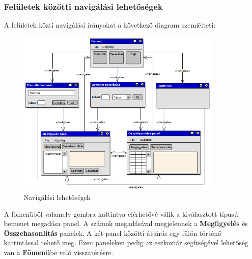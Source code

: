 \documentclass{elteikthesis}
\begin{document}
\subsubsection{Felületek közötti navigálási lehetőségek}
A felületek közti navigálási irányokat a következő diagram szemlélteti:
\begin{figure}[H]
	\centering
	\includegraphics[width=0.9\textwidth]{pics/plan_directions.png}
	\caption{Navigálási lehetőségek}
\end{figure}\par
A főmenüből valamely gombra kattintva elérhetővé válik a kiválasztott típusú bemenet megadása panel. A számok megadásával megjelennek a \textbf{Megfigyelés} és \textbf{Összehasonlítás} panelek. A két panel közötti átjárás egy fülön történő kattintással tehető meg. Ezen paneleken pedig az eszköztár segítségével lehetőség van a \textbf{Főmenü}be való visszatérésre.
\end{document}
